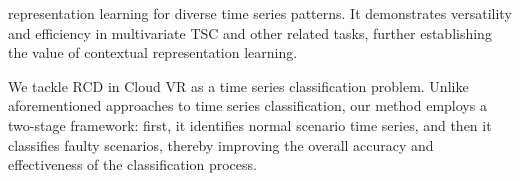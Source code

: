 representation learning for diverse time series patterns. It demonstrates versatility and efficiency in multivariate TSC and other related tasks, further establishing the value of contextual representation learning.

We tackle RCD in Cloud VR as a time series classification problem. Unlike aforementioned approaches to time series classification, our method employs a two-stage framework: first, it identifies normal scenario time series, and then it classifies faulty scenarios, thereby improving the overall accuracy and effectiveness of the classification process.


 




